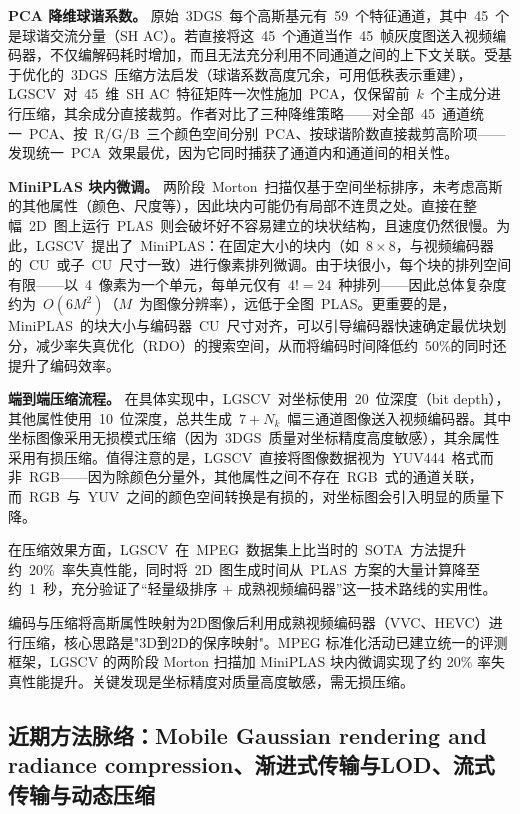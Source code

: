 \textbf{PCA 降维球谐系数。}
原始~3DGS~每个高斯基元有~59~个特征通道，其中~45~个是球谐交流分量（SH AC）。若直接将这~45~个通道当作~45~帧灰度图送入视频编码器，不仅编解码耗时增加，而且无法充分利用不同通道之间的上下文关联。受基于优化的~3DGS~压缩方法启发（球谐系数高度冗余，可用低秩表示重建），LGSCV~对~45~维~SH AC~特征矩阵一次性施加~PCA，仅保留前~$k$~个主成分进行压缩，其余成分直接裁剪。作者对比了三种降维策略——对全部~45~通道统一~PCA、按~R/G/B~三个颜色空间分别~PCA、按球谐阶数直接裁剪高阶项——发现统一~PCA~效果最优，因为它同时捕获了通道内和通道间的相关性。

\textbf{MiniPLAS 块内微调。}
两阶段~Morton~扫描仅基于空间坐标排序，未考虑高斯的其他属性（颜色、尺度等），因此块内可能仍有局部不连贯之处。直接在整幅~2D~图上运行~PLAS~则会破坏好不容易建立的块状结构，且速度仍然很慢。为此，LGSCV~提出了~MiniPLAS：在固定大小的块内（如~$8 \times 8$，与视频编码器的~CU~或子~CU~尺寸一致）进行像素排列微调。由于块很小，每个块的排列空间有限——以~4~像素为一个单元，每单元仅有~$4! = 24$~种排列——因此总体复杂度约为~$O(6M^2)$（$M$~为图像分辨率），远低于全图~PLAS。更重要的是，MiniPLAS~的块大小与编码器~CU~尺寸对齐，可以引导编码器快速确定最优块划分，减少率失真优化（RDO）的搜索空间，从而将编码时间降低约~50\%的同时还提升了编码效率。

\textbf{端到端压缩流程。}
在具体实现中，LGSCV~对坐标使用~20~位深度（bit depth），其他属性使用~10~位深度，总共生成~$7 + N_k$~幅三通道图像送入视频编码器。其中坐标图像采用无损模式压缩（因为~3DGS~质量对坐标精度高度敏感），其余属性采用有损压缩。值得注意的是，LGSCV~直接将图像数据视为~YUV444~格式而非~RGB——因为除颜色分量外，其他属性之间不存在~RGB~式的通道关联，而~RGB~与~YUV~之间的颜色空间转换是有损的，对坐标图会引入明显的质量下降。

在压缩效果方面，LGSCV~在~MPEG~数据集上比当时的~SOTA~方法提升约~20\%~率失真性能，同时将~2D~图生成时间从~PLAS~方案的大量计算降至约~1~秒，充分验证了``轻量级排序 + 成熟视频编码器''这一技术路线的实用性。

\begin{takeaway}
编码与压缩将高斯属性映射为2D图像后利用成熟视频编码器（VVC、HEVC）进行压缩，核心思路是"3D到2D的保序映射"。MPEG 标准化活动已建立统一的评测框架，LGSCV 的两阶段 Morton 扫描加 MiniPLAS 块内微调实现了约 20\% 率失真性能提升。关键发现是坐标精度对质量高度敏感，需无损压缩。
\end{takeaway}



\subsection{近期方法脉络：Mobile Gaussian rendering and radiance compression、渐进式传输与LOD、流式传输与动态压缩}

